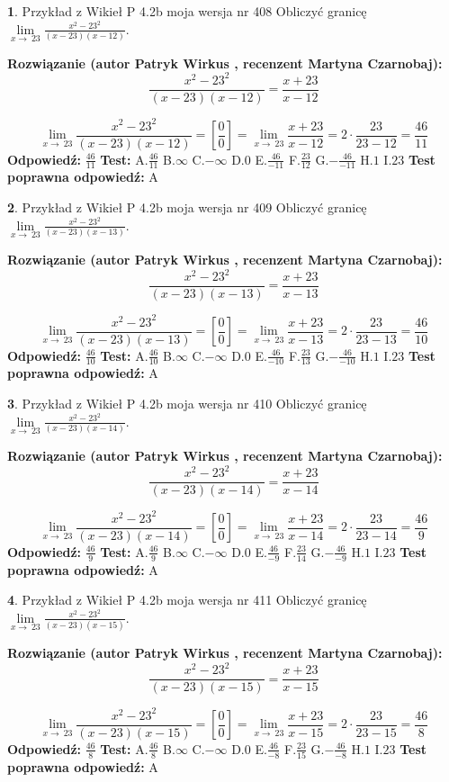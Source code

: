 \documentclass[12pt, a4paper]{article}
\theoremstyle{definition} %
\newtheorem{zad}{}
\newcommand{\zadStart}[1]{\begin{zad}#1\newline}
\newcommand{\zadStop}{\end{zad}}
\newcommand{\rozwStart}[2]{\noindent \textbf{Rozwiązanie (autor #1 , recenzent #2): }\newline}
\newcommand{\rozwStop}{\newline}
\newcommand{\odpStart}{\noindent \textbf{Odpowiedź:}\newline}
\newcommand{\odpStop}{\newline}
\newcommand{\testStart}{\noindent \textbf{Test:}\newline}
\newcommand{\testStop}{\newline}
\newcommand{\kluczStart}{\noindent \textbf{Test poprawna odpowiedź:}\newline}
\newcommand{\kluczStop}{\newline}
\begin{document}
\zadStart{Przykład z Wikieł P 4.2b moja wersja nr 408}
Obliczyć granicę $\lim\limits_{x\to\ 23}\frac{x^{2}-23^{2}}{(x-23)(x-12)}$.
\zadStop
\rozwStart{Patryk Wirkus}{Martyna Czarnobaj}
$$\frac{x^{2}-23^{2}}{(x-23)(x-12)}=\frac{x+23}{x-12}$$

$$\lim\limits_{x\to\ 23}\frac{x^{2}-23^{2}}{(x-23)(x-12)}=[\frac{0}{0}]=\lim\limits_{x\to\ 23}\frac{x+23}{x-12}=2 \cdot \frac{23}{23-12} = \frac{46}{11}$$
\rozwStop
\odpStart
$\frac{46}{11}$
\odpStop
\testStart
A.$\frac{46}{11}$
B.$\infty$
C.$-\infty$
D.$0$
E.$\frac{46}{-11}$
F.$\frac{23}{12}$
G.$-\frac{46}{-11}$
H.$1$
I.$23$
\testStop
\kluczStart
A
\kluczStop



\zadStart{Przykład z Wikieł P 4.2b moja wersja nr 409}
Obliczyć granicę $\lim\limits_{x\to\ 23}\frac{x^{2}-23^{2}}{(x-23)(x-13)}$.
\zadStop
\rozwStart{Patryk Wirkus}{Martyna Czarnobaj}
$$\frac{x^{2}-23^{2}}{(x-23)(x-13)}=\frac{x+23}{x-13}$$

$$\lim\limits_{x\to\ 23}\frac{x^{2}-23^{2}}{(x-23)(x-13)}=[\frac{0}{0}]=\lim\limits_{x\to\ 23}\frac{x+23}{x-13}=2 \cdot \frac{23}{23-13} = \frac{46}{10}$$
\rozwStop
\odpStart
$\frac{46}{10}$
\odpStop
\testStart
A.$\frac{46}{10}$
B.$\infty$
C.$-\infty$
D.$0$
E.$\frac{46}{-10}$
F.$\frac{23}{13}$
G.$-\frac{46}{-10}$
H.$1$
I.$23$
\testStop
\kluczStart
A
\kluczStop



\zadStart{Przykład z Wikieł P 4.2b moja wersja nr 410}
Obliczyć granicę $\lim\limits_{x\to\ 23}\frac{x^{2}-23^{2}}{(x-23)(x-14)}$.
\zadStop
\rozwStart{Patryk Wirkus}{Martyna Czarnobaj}
$$\frac{x^{2}-23^{2}}{(x-23)(x-14)}=\frac{x+23}{x-14}$$

$$\lim\limits_{x\to\ 23}\frac{x^{2}-23^{2}}{(x-23)(x-14)}=[\frac{0}{0}]=\lim\limits_{x\to\ 23}\frac{x+23}{x-14}=2 \cdot \frac{23}{23-14} = \frac{46}{9}$$
\rozwStop
\odpStart
$\frac{46}{9}$
\odpStop
\testStart
A.$\frac{46}{9}$
B.$\infty$
C.$-\infty$
D.$0$
E.$\frac{46}{-9}$
F.$\frac{23}{14}$
G.$-\frac{46}{-9}$
H.$1$
I.$23$
\testStop
\kluczStart
A
\kluczStop



\zadStart{Przykład z Wikieł P 4.2b moja wersja nr 411}
Obliczyć granicę $\lim\limits_{x\to\ 23}\frac{x^{2}-23^{2}}{(x-23)(x-15)}$.
\zadStop
\rozwStart{Patryk Wirkus}{Martyna Czarnobaj}
$$\frac{x^{2}-23^{2}}{(x-23)(x-15)}=\frac{x+23}{x-15}$$

$$\lim\limits_{x\to\ 23}\frac{x^{2}-23^{2}}{(x-23)(x-15)}=[\frac{0}{0}]=\lim\limits_{x\to\ 23}\frac{x+23}{x-15}=2 \cdot \frac{23}{23-15} = \frac{46}{8}$$
\rozwStop
\odpStart
$\frac{46}{8}$
\odpStop
\testStart
A.$\frac{46}{8}$
B.$\infty$
C.$-\infty$
D.$0$
E.$\frac{46}{-8}$
F.$\frac{23}{15}$
G.$-\frac{46}{-8}$
H.$1$
I.$23$
\testStop
\kluczStart
A
\kluczStop
\end{document}
